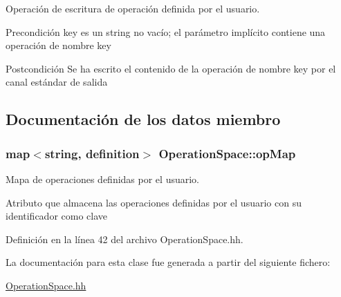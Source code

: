Operación de escritura de operación definida por el usuario. 

\begin{DoxyPrecond}{Precondición}
\textquotesingle{}key\textquotesingle{} es un string no vacío; el parámetro implícito contiene una operación de nombre \textquotesingle{}key\textquotesingle{} 
\end{DoxyPrecond}
\begin{DoxyPostcond}{Postcondición}
Se ha escrito el contenido de la operación de nombre \textquotesingle{}key\textquotesingle{} por el canal estándar de salida 
\end{DoxyPostcond}


\subsection{Documentación de los datos miembro}
\subsubsection[{\texorpdfstring{op\+Map}{opMap}}]{\setlength{\rightskip}{0pt plus 5cm}map$<$string, {\bf definition}$>$ Operation\+Space\+::op\+Map\hspace{0.3cm}{\ttfamily [private]}}\hypertarget{class_operation_space_aae64cd370655d6b2fb3f2305c5a520a7}{}\label{class_operation_space_aae64cd370655d6b2fb3f2305c5a520a7}


Mapa de operaciones definidas por el usuario. 

Atributo que almacena las operaciones definidas por el usuario con su identificador como clave 

Definición en la línea 42 del archivo Operation\+Space.\+hh.



La documentación para esta clase fue generada a partir del siguiente fichero\+:\begin{DoxyCompactItemize}
\item 
\hyperlink{_operation_space_8hh}{Operation\+Space.\+hh}\end{DoxyCompactItemize}
